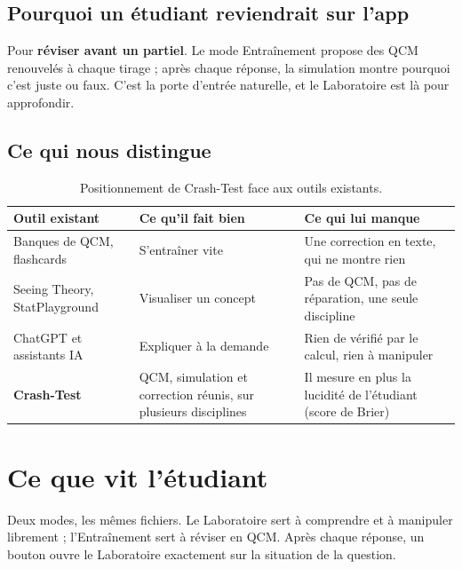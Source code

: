 \documentclass[11pt,a4paper]{article}
\begin{document}
\subsection{Pourquoi un étudiant reviendrait sur l'app}
Pour \textbf{réviser avant un partiel}. Le mode Entraînement propose des QCM renouvelés à chaque tirage ; après chaque réponse, la simulation montre pourquoi c'est juste ou faux. C'est la porte d'entrée naturelle, et le Laboratoire est là pour approfondir.

\subsection{Ce qui nous distingue}
\begin{table}[H]
  \centering
  \small
  \begin{tabularx}{\textwidth}{@{}L{4.2cm} Y Y@{}}
    \toprule
    \textbf{Outil existant} & \textbf{Ce qu'il fait bien} & \textbf{Ce qui lui manque} \\
    \midrule
    Banques de QCM, flashcards & S'entraîner vite & Une correction en texte, qui ne montre rien \\
    Seeing Theory, StatPlayground & Visualiser un concept & Pas de QCM, pas de réparation, une seule discipline \\
    ChatGPT et assistants IA & Expliquer à la demande & Rien de vérifié par le calcul, rien à manipuler \\
    \textbf{Crash-Test} & QCM, simulation et correction réunis, sur plusieurs disciplines & Il mesure en plus la lucidité de l'étudiant (score de Brier) \\
    \bottomrule
  \end{tabularx}
  \caption{Positionnement de Crash-Test face aux outils existants.}
\end{table}

\section{Ce que vit l'étudiant}

\begin{enbref}
Deux modes, les mêmes fichiers. Le Laboratoire sert à comprendre et à manipuler librement ; l'Entraînement sert à réviser en QCM. Après chaque réponse, un bouton ouvre le Laboratoire exactement sur la situation de la question.
\end{enbref}
\end{document}
